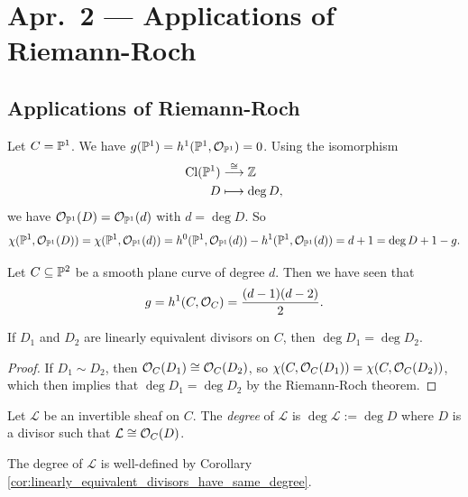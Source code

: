\chapter{Apr.~2 --- Applications of Riemann-Roch}

\section{Applications of Riemann-Roch}

\begin{example}
  Let $C = \mathbb{P}^1$. We have
  $g(\mathbb{P}^1) = h^1(\mathbb{P}^1, \mathcal{O}_{\mathbb{P}^1}) = 0$.
  Using the isomorphism
  \begin{align*}
    \operatorname{Cl}(\mathbb{P}^1) &\overset{\cong}{\longrightarrow}
    \mathbb{Z} \\
    D &\longmapsto \deg D,
  \end{align*}
  we have $\mathcal{O}_{\mathbb{P}^1}(D) = \mathcal{O}_{\mathbb{P}^1}(d)$
  with $d = \deg D$. So
  \[
    \chi(\mathbb{P}^1, \mathcal{O}_{\mathbb{P}^1}(D))
    = \chi(\mathbb{P}^1, \mathcal{O}_{\mathbb{P}^1}(d))
    = h^0(\mathbb{P}^1, \mathcal{O}_{\mathbb{P}^1}(d))
    - h^1(\mathbb{P}^1, \mathcal{O}_{\mathbb{P}^1}(d))
    = d + 1 = \deg D + 1 - g.
  \]
\end{example}

\begin{example}
  Let $C \subseteq \mathbb{P}^2$ be a smooth
  plane curve of degree $d$. Then
  we have seen that
  \[
    g = h^1(C, \mathcal{O}_C) = \frac{(d - 1)(d - 2)}{2}.
  \]
\end{example}

\begin{corollary}\label{cor:linearly_equivalent_divisors_have_same_degree}
  If $D_1$ and $D_2$ are linearly
  equivalent divisors on $C$, then
  $\deg D_1 = \deg D_2$.
\end{corollary}

\begin{proof}
  If $D_1 \sim D_2$, then
  $\mathcal{O}_C(D_1) \cong \mathcal{O}_C(D_2)$, so
  $\chi(C, \mathcal{O}_C(D_1)) = \chi(C, \mathcal{O}_C(D_2))$,
  which then implies that
  $\deg D_1 = \deg D_2$ by the
  Riemann-Roch theorem.
\end{proof}

\begin{definition}
  Let $\mathcal{L}$ be an invertible sheaf
  on $C$. The \emph{degree} of $\mathcal{L}$
  is $\deg \mathcal{L} := \deg D$ where
  $D$ is a divisor such that
  $\mathcal{L} \cong \mathcal{O}_C(D)$.
\end{definition}

\begin{remark}
  The degree of $\mathcal{L}$ is
  well-defined by Corollary
  \ref{cor:linearly_equivalent_divisors_have_same_degree}.
\end{remark}

